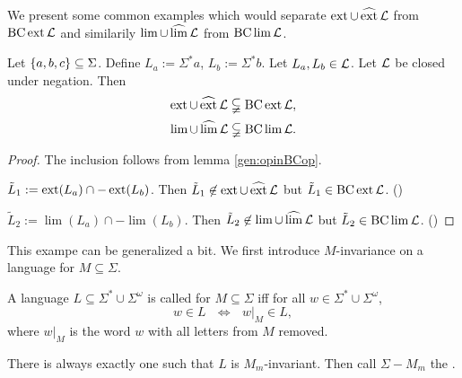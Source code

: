 
We present some common examples which would separate $\operatorname{ext}\cup\operatorname{\widehat{ext}} \mathcal{L}$ from $\operatorname{BC} \operatorname{ext} \mathcal{L}$ and similarily $\lim\cup\operatorname{\widehat{lim}} \mathcal{L}$ from $\operatorname{BC} \lim \mathcal{L}$.

\begin{example}
\label{gen:example:extBCextSeparate}
Let $\Set{a,b,c} \subseteq \Sigma$. Define $L_a := \Sigma^*a$, $L_b := \Sigma^*b$. Let $L_a,L_b \in \mathcal{L}$. Let $\mathcal{L}$ be closed under negation. Then
\[ \operatorname{ext} \cup \operatorname{\widehat{ext}} \mathcal{L} \subsetneqq \operatorname{BC} \operatorname{ext} \mathcal{L} , \]
\[ \lim \cup \operatorname{\widehat{lim}} \mathcal{L} \subsetneqq \operatorname{BC} \lim \mathcal{L} . \]
\begin{proof}
The inclusion follows from lemma \ref{gen:opinBCop}.

$\tilde L_1 := \operatorname{ext}(L_a) \cap -\operatorname{ext}(L_b)$. Then $\tilde L_1 \not\in \operatorname{ext} \cup \operatorname{\widehat{ext}} \mathcal{L}$ but $\tilde L_1 \in \operatorname{BC} \operatorname{ext} \mathcal{L}$. ()

$\tilde L_2 := \lim(L_a) \cap -\lim(L_b)$. Then $\tilde L_2 \not\in \lim \cup \operatorname{\widehat{lim}} \mathcal{L}$ but $\tilde L_2 \in \operatorname{BC} \lim \mathcal{L}$. ()
\end{proof}
\end{example}

This exampe can be generalized a bit. We first introduce $M$-invariance on a language for $M\subseteq\Sigma$.

\begin{mydef}
A language $L \subseteq \Sigma^* \cup \Sigma^\omega$ is called  for $M \subseteq\Sigma$ iff for all $w \in \Sigma^* \cup \Sigma^\omega$,
\[ w \in L \ \ \ \Leftrightarrow \ \ \  w |_M \in L , \]
where $w|_M$ is the word $w$ with all letters from $M$ removed.

There is always exactly one  such that $L$ is $M_m$-invariant. Then call $\Sigma-M_m$ the .
\end{mydef}

